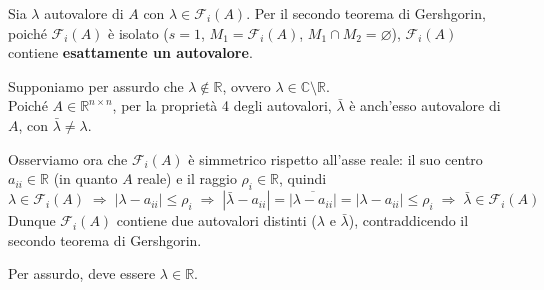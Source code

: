 \documentclass[12pt,a4paper,]{report}
\begin{document}
\begin{dimostrazione}
    [Conseguenza 2]
    Sia $\lambda$ autovalore di $A$ con $\lambda \in \mathcal{F}_i(A)$. Per il secondo teorema di
    Gershgorin, poiché $\mathcal{F}_i(A)$ è isolato ($s = 1$, $M_1 = \mathcal{F}_i(A)$,
    $M_1 \cap M_2 = \varnothing$), $\mathcal{F}_i(A)$ contiene \textbf{esattamente un autovalore}.
    
    \medskip\noindent
    Supponiamo per assurdo che $\lambda \notin \mathbb{R}$, ovvero $\lambda \in \mathbb{C} \setminus \mathbb{R}$.\\
    Poiché $A \in \mathbb{R}^{n \times n}$, per la proprietà 4 degli autovalori, $\bar{\lambda}$ è
    anch'esso autovalore di $A$, con $\bar{\lambda} \neq \lambda$.

    \medskip\noindent
    Osserviamo ora che $\mathcal{F}_i(A)$ è simmetrico rispetto all'asse reale: il suo centro
    $a_{ii} \in \mathbb{R}$ (in quanto $A$ reale) e il raggio $\rho_i \in \mathbb{R}$, quindi
    \[
        \lambda \in \mathcal{F}_i(A)
        \;\Longrightarrow\;
        |\lambda - a_{ii}| \leq \rho_i
        \;\Longrightarrow\;
        |\bar{\lambda} - a_{ii}| = \overline{|\lambda - a_{ii}|} = |\lambda - a_{ii}| \leq \rho_i
        \;\Longrightarrow\;
        \bar{\lambda} \in \mathcal{F}_i(A)
    \]
    Dunque $\mathcal{F}_i(A)$ contiene due autovalori distinti ($\lambda$ e $\bar{\lambda}$),
    contraddicendo il secondo teorema di Gershgorin.

    \medskip\noindent
    Per assurdo, deve essere $\lambda \in \mathbb{R}$.
\end{dimostrazione}
\end{document}
